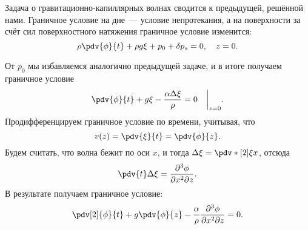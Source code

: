 Задача о гравитационно-капиллярных волнах сводится к предыдущей, решённой нами. Граничное условие на дне~--- условие непротекания, а на поверхности за счёт сил поверхностного натяжения граничное условие изменится:
\begin{equation}
    \rho\pdv{\phi}{t}+\rho g\xi+p_0+\delta p_s = 0, \quad z = 0.
\end{equation}

От $p_0$ мы избавляемся аналогично предыдущей задаче, и в итоге получаем граничное условие
\begin{equation}
    \pdv{\phi}{t}+g\xi-\frac{\alpha \Delta\xi}{\rho} = 0 \quad\bigg|_{z = 0}.
\end{equation}
 Продифференцируем граничное условие по времени, учитывая, что
 \begin{equation}
 	v(z) = \pdv{\xi}{t}=\pdv{\phi}{z}.
 \end{equation}
Будем считать, что волна бежит по оси $x$, и тогда $\Delta \xi = \pdv*[2]{\xi}{x}$, отсюда
\begin{equation}
	\pdv{t}\Delta \xi = \frac{\partial^3\phi}{\partial x^2 \partial z}.
\end{equation}
В результате получаем граничное условие:
\begin{equation}
    \pdv[2]{\phi}{t}+g\pdv{\phi}{z}-\frac{\alpha}{\rho}\frac{\partial^3\phi}{\partial x^2 \partial z} = 0.
\end{equation}

